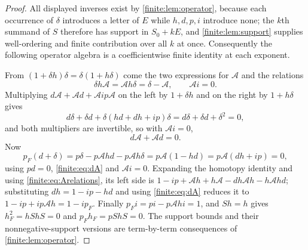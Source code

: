 \documentclass[11pt,letterpaper]{article}
\theoremstyle{definition}
\theoremstyle{remark}
\numberwithin{equation}{section}
\begin{document}
\begin{proof}
All displayed inverses exist by \cref{finite:lem:operator}, because each occurrence of $\delta$ introduces a letter of $E$ while $h,d,p,i$ introduce none; the $k$th summand of $S$ therefore has support in $S_0+kE$, and \cref{finite:lem:support} supplies well-ordering and finite contribution over all $k$ at once. Consequently the following operator algebra is a coefficientwise finite identity at each exponent.

From $(1+\delta h)\delta=\delta(1+h\delta)$ come the two expressions for $\mathcal A$ and the relations
\begin{equation}\label{finite:eq:Arelations}
 \delta h\mathcal A=\mathcal Ah\delta=\delta-\mathcal A,
 \qquad \mathcal Ai=0 .
\end{equation}
Multiplying $d\mathcal A+\mathcal Ad+\mathcal Aip\mathcal A$ on the left by $1+\delta h$ and on the right by $1+h\delta$ gives
\[
 d\delta+\delta d+\delta(hd+dh+ip)\delta=d\delta+\delta d+\delta^2=0,
\]
and both multipliers are invertible, so with $\mathcal Ai=0$,
\begin{equation}\label{finite:eq:dA}
 d\mathcal A+\mathcal Ad=0 .
\end{equation}
Now
\[
 p_F(d+\delta)=p\delta-p\mathcal Ahd-p\mathcal Ah\delta
 =p\mathcal A(1-hd)=p\mathcal A(dh+ip)=0,
\]
using $pd=0$, \eqref{finite:eq:dA} and $\mathcal Ai=0$. Expanding the homotopy identity and using \eqref{finite:eq:Arelations}, its left side is $1-ip+\mathcal Ah+h\mathcal A-dh\mathcal Ah-h\mathcal Ahd$; substituting $dh=1-ip-hd$ and using \eqref{finite:eq:dA} reduces it to $1-ip+ip\mathcal Ah=1-ip_F$. Finally $p_Fi=pi-p\mathcal Ahi=1$, and $Sh=h$ gives $h_F^2=hShS=0$ and $p_Fh_F=pShS=0$. The support bounds and their nonnegative-support versions are term-by-term consequences of \cref{finite:lem:operator}.
\end{proof}
\end{document}
